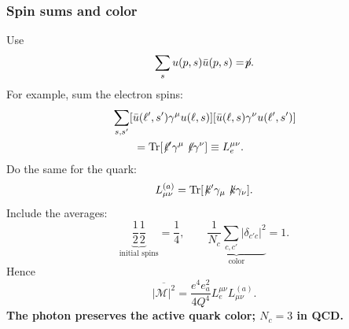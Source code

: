 \documentclass[14pt,a4paper]{extarticle}
\numberwithin{equation}{section}
\newcommand{\M}{\mathcal M}
\newcommand{\slsh}[1]{\not\!#1}
\begin{document}
\subsubsection{Spin sums and color}
Use
\begin{equation}
 \sum_su(p,s)\bar u(p,s)=\slsh p.
\end{equation}
For example, sum the electron spins:
\begin{align}
 &\sum_{s,s'}[\bar u(\ell',s')\gamma^\mu u(\ell,s)]
 [\bar u(\ell,s)\gamma^\nu u(\ell',s')]\notag\\
 &\qquad=\operatorname{Tr}
 [\slsh{\ell'}\gamma^\mu\slsh\ell\gamma^\nu]
 \equiv L_e^{\mu\nu}.
 \label{eq:hard-current-trace}
\end{align}
Do the same for the quark:
\begin{equation}
 L^{(a)}_{\mu\nu}
 =\operatorname{Tr}[\slsh{k'}\gamma_\mu\slsh k\gamma_\nu].
\end{equation}
Include the averages:
\begin{equation}
 \underbrace{\frac12\frac12}_{\text{initial spins}}=\frac14,
 \qquad
 \underbrace{\frac1{N_c}\sum_{c,c'}|\delta_{c'c}|^2}_{\text{color}}=1.
\end{equation}
Hence
\begin{equation}
 \boxed{\overline{|\M|^2}
 =\frac{e^4e_a^2}{4Q^4}L_e^{\mu\nu}L^{(a)}_{\mu\nu}.}
 \label{eq:hard-trace-start}
\end{equation}
\textbf{The photon preserves the active quark color; $N_c=3$ in QCD.}
\end{document}
